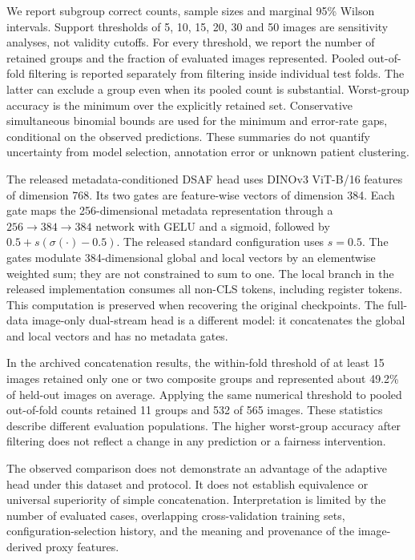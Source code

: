 We report subgroup correct counts, sample sizes and marginal 95\% Wilson
intervals. Support thresholds of 5, 10, 15, 20, 30 and 50 images are sensitivity
analyses, not validity cutoffs. For every threshold, we report the number of
retained groups and the fraction of evaluated images represented. Pooled
out-of-fold filtering is reported separately from filtering inside individual
test folds. The latter can exclude a group even when its pooled count is
substantial. Worst-group accuracy is the minimum over the explicitly retained
set. Conservative simultaneous binomial bounds are used for the minimum and
error-rate gaps, conditional on the observed predictions. These summaries do
not quantify uncertainty from model selection, annotation error or unknown
patient clustering.

The released metadata-conditioned DSAF head uses DINOv3 ViT-B/16 features of
dimension 768. Its two gates are feature-wise vectors of dimension 384. Each
gate maps the 256-dimensional metadata representation through a
$256\!\rightarrow\!384\!\rightarrow\!384$ network with GELU and a sigmoid,
followed by $0.5+s(\sigma(\cdot)-0.5)$. The released standard configuration uses
$s=0.5$. The gates modulate 384-dimensional global and local vectors by an
elementwise weighted sum; they are not constrained to sum to one. The local
branch in the released implementation consumes all non-CLS tokens, including
register tokens. This computation is preserved when recovering the original
checkpoints. The full-data image-only dual-stream head is a different model:
it concatenates the global and local vectors and has no metadata gates.

In the archived concatenation results, the within-fold threshold of at least
15 images retained only one or two composite groups and represented about
49.2\% of held-out images on average. Applying the same numerical threshold to
pooled out-of-fold counts retained 11 groups and 532 of 565 images. These
statistics describe different evaluation populations. The higher worst-group
accuracy after filtering does not reflect a change in any prediction or a
fairness intervention.

The observed comparison does not demonstrate an advantage of the adaptive
head under this dataset and protocol. It does not establish equivalence or
universal superiority of simple concatenation. Interpretation is limited by
the number of evaluated cases, overlapping cross-validation training sets,
configuration-selection history, and the meaning and provenance of the
image-derived proxy features.

